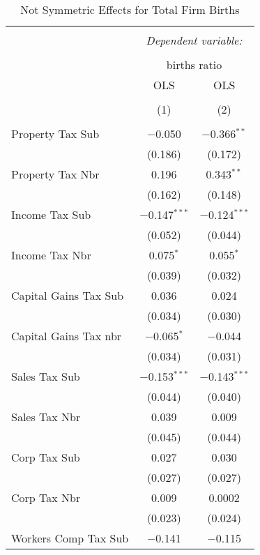 
\begin{table}[!htbp] \centering 
  \caption{Not Symmetric Effects for  Total Firm Births} 
  \label{--noequality} 
\footnotesize 
\begin{tabular}{@{\extracolsep{5pt}}lcc} 
\\[-1.8ex]\hline 
\hline \\[-1.8ex] 
 & \multicolumn{2}{c}{\textit{Dependent variable:}} \\ 
\cline{2-3} 
\\[-1.8ex] & \multicolumn{2}{c}{births ratio} \\ 
 & OLS & OLS \\ 
\\[-1.8ex] & (1) & (2)\\ 
\hline \\[-1.8ex] 
 Property Tax Sub & $-$0.050 & $-$0.366$^{**}$ \\ 
  & (0.186) & (0.172) \\ 
  Property Tax Nbr & 0.196 & 0.343$^{**}$ \\ 
  & (0.162) & (0.148) \\ 
  Income Tax Sub & $-$0.147$^{***}$ & $-$0.124$^{***}$ \\ 
  & (0.052) & (0.044) \\ 
  Income Tax Nbr & 0.075$^{*}$ & 0.055$^{*}$ \\ 
  & (0.039) & (0.032) \\ 
  Capital Gains Tax Sub & 0.036 & 0.024 \\ 
  & (0.034) & (0.030) \\ 
  Capital Gains Tax nbr & $-$0.065$^{*}$ & $-$0.044 \\ 
  & (0.034) & (0.031) \\ 
  Sales Tax Sub & $-$0.153$^{***}$ & $-$0.143$^{***}$ \\ 
  & (0.044) & (0.040) \\ 
  Sales Tax Nbr & 0.039 & 0.009 \\ 
  & (0.045) & (0.044) \\ 
  Corp Tax Sub & 0.027 & 0.030 \\ 
  & (0.027) & (0.027) \\ 
  Corp Tax Nbr & 0.009 & 0.0002 \\ 
  & (0.023) & (0.024) \\ 
  Workers Comp Tax Sub & $-$0.141 & $-$0.115 \\ 

\end{tabular}
\end{table}
